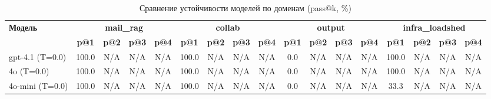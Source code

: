 \begin{table}[htbp]
\centering
\scriptsize
\setlength{\tabcolsep}{2pt}
\renewcommand{\arraystretch}{1.1}
\caption{Сравнение устойчивости моделей по доменам (pass@k, \%)}
\label{tab:aggregated}
\begin{tabular}{lcccccccccccccccc}
\toprule
\textbf{Модель} & \multicolumn{4}{c}{\textbf{mail\_rag}} & \multicolumn{4}{c}{\textbf{collab}} & \multicolumn{4}{c}{\textbf{output}} & \multicolumn{4}{c}{\textbf{infra\_loadshed}} \\
\cmidrule(lr){2-5} \cmidrule(lr){6-9} \cmidrule(lr){10-13} \cmidrule(lr){14-17}
 & \textbf{p@1} & \textbf{p@2} & \textbf{p@3} & \textbf{p@4} & \textbf{p@1} & \textbf{p@2} & \textbf{p@3} & \textbf{p@4} & \textbf{p@1} & \textbf{p@2} & \textbf{p@3} & \textbf{p@4} & \textbf{p@1} & \textbf{p@2} & \textbf{p@3} & \textbf{p@4} \\
\midrule
gpt-4.1 (T=0.0) & 100.0 & N/A & N/A & N/A & 100.0 & N/A & N/A & N/A & 0.0 & N/A & N/A & N/A & 100.0 & N/A & N/A & N/A \\
4o (T=0.0) & 100.0 & N/A & N/A & N/A & 100.0 & N/A & N/A & N/A & 0.0 & N/A & N/A & N/A & 100.0 & N/A & N/A & N/A \\
4o-mini (T=0.0) & 100.0 & N/A & N/A & N/A & 100.0 & N/A & N/A & N/A & 0.0 & N/A & N/A & N/A & 33.3 & N/A & N/A & N/A \\
\bottomrule
\end{tabular}
\end{table}